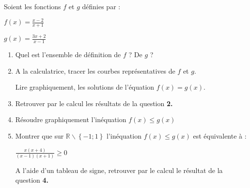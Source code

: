 
%
Soient les fonctions $f$ et $g$ définies par :
\par
$f\left(x\right)=\frac{x-2}{x+1}$
\par
$g\left(x\right)=\frac{3x+2}{x-1}$
\begin{enumerate}
     \item
     Quel est l'ensemble de définition de $f$ ? De $g$ ?
     \item
     A la calculatrice, tracer les courbes représentatives de $f$ et $g$.
     \par
     Lire graphiquement, les solutions de l'équation $f\left(x\right)=g\left(x\right)$.
     \item
     Retrouver par le calcul les résultats de la question \textbf{2.}
     \item
     Résoudre graphiquement l'inéquation $f\left(x\right)\leqslant g\left(x\right)$
     \item
     Montrer que sur $\mathbb{R}\backslash\left\{-1 ; 1\right\}$ l'inéquation $f\left(x\right)\leqslant g\left(x\right)$ est équivalente à :
     \par
     $\frac{x\left(x+4\right)}{\left(x-1\right)\left(x+1\right)}\geqslant 0$
     \par
     A l'aide d'un tableau de signe, retrouver par le calcul le résultat de la question \textbf{4.}
\end{enumerate}
